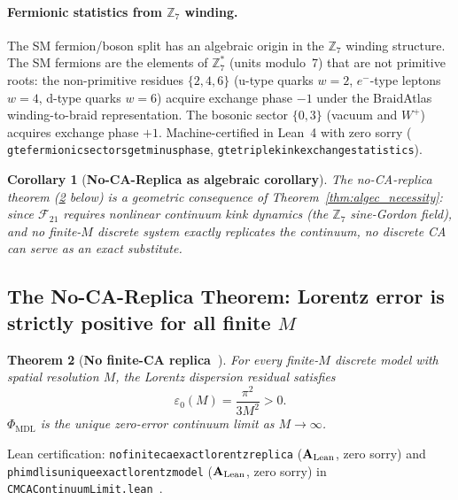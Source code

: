 \documentclass[11pt]{article}
\newtheorem{theorem}{Theorem}[section]
\newtheorem{corollary}[theorem]{Corollary}
\theoremstyle{remark}
\newcommand{\PHIMDL}{\Phi_{\mathrm{MDL}}}
\newcommand{\ZS}{\mathbb{Z}_7}
\newcommand{\lean}[1]{%
  \penalty-100
  \begingroup\def\_{\textunderscore\allowbreak}\texttt{#1}\endgroup}
\newcommand{\epsz}{\varepsilon_0}
\newcommand{\FTT}{\mathcal{F}_{21}}
\newcommand{\CatAL}{\ensuremath{\textbf{A}_{\rm Lean}}}
\begin{document}
\paragraph{Fermionic statistics from $\ZS$ winding.}
The SM fermion/boson split has an algebraic origin in the $\ZS$ winding
structure.  The SM fermions are the elements of $\ZS^*$ (units modulo~7)
that are not primitive roots: the non-primitive residues $\{2,4,6\}$
(u-type quarks $w=2$, $e^-$-type leptons $w=4$, d-type quarks $w=6$)
acquire exchange phase $-1$ under the BraidAtlas winding-to-braid
representation.  The bosonic sector $\{0,3\}$ (vacuum and $W^+$) acquires
exchange phase $+1$.
Machine-certified in Lean~4 with zero sorry
(\lean{gte\_fermionic\_sectors\_get\_minus\_phase},
\lean{gte\_triple\_kink\_exchange\_statistics}).

\begin{corollary}[\textbf{No-CA-Replica as algebraic corollary}]
\label{cor:noca_from_necessity}
The no-CA-replica theorem (\cref{thm:noca} below) is a geometric consequence
of Theorem~\ref{thm:algec_necessity}: since $\FTT$ requires nonlinear continuum
kink dynamics (the $\ZS$ sine-Gordon field), and no finite-$M$ discrete system
exactly replicates the continuum, no discrete CA can serve as an exact substitute.
\end{corollary}

\subsection{The No-CA-Replica Theorem: Lorentz error is strictly positive for all finite \texorpdfstring{$M$}{M}}
\label{sec:noca_theorem}

\begin{theorem}[\textbf{No finite-CA replica~\cite{SpivackCMCA,SpivackPhiMDLField}}]
\label{thm:noca}
For every finite-$M$ discrete model with spatial resolution $M$, the
Lorentz dispersion residual satisfies
\[
  \epsz(M) = \frac{\pi^2}{3M^2} > 0.
\]
$\PHIMDL$ is the unique zero-error continuum limit as $M\to\infty$.
\end{theorem}

\noindent
Lean certification: \lean{no\_finite\_ca\_exact\_lorentz\_replica} ($\CatAL$,
zero sorry) and \lean{phimdl\_is\_unique\_exact\_lorentz\_model} ($\CatAL$,
zero sorry) in \lean{CMCAContinuumLimit.lean}~\cite{SpivackPhiMDLField,SpivackCMCA}.
\end{document}
